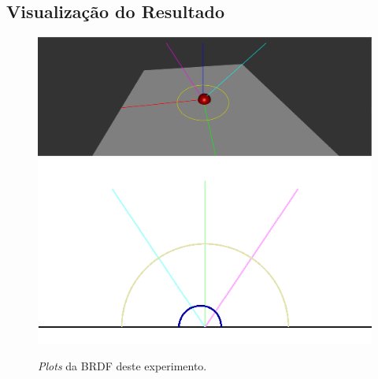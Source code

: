 \subsection{Visualização do Resultado}
\begin{figure}[H]
    \caption{\small{\textit{Plots} da BRDF deste experimento.}}\label{fig-oren-nayar-plots}
    \vspace{42px}
  \includegraphics[width=\linewidth]{./Imagens/brdfs/oren-nayar-3D-plot}
\endminipage\hfill
{}
  \includegraphics[width=\linewidth]{./Imagens/brdfs/oren-nayar-polar-plot.png}
\endminipage\hfill
\end{figure}

